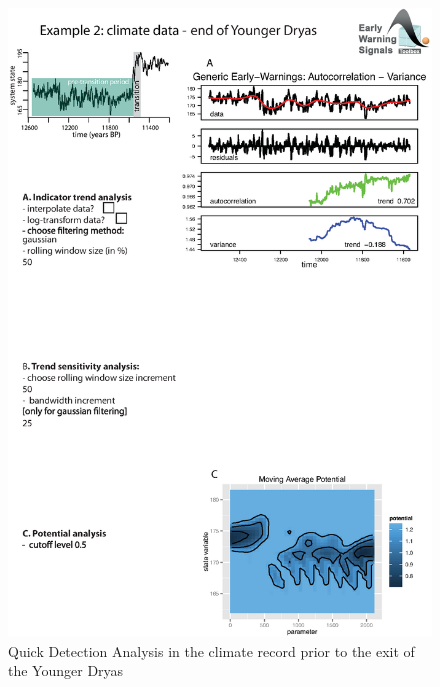 \documentclass[12pt,a4paper,final]{article}
\begin{document}
\begin{figure}[h]
\begin{center}
\includegraphics[scale=0.8]{fig_3_new.eps}
\caption{Quick Detection Analysis in the climate record prior to the exit of the Younger Dryas}
\end{center}
\label{fig:QDA_climate}
\end{figure}
\end{document}
